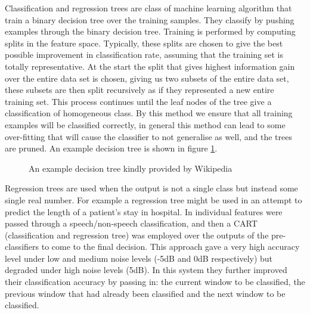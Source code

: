 \documentclass[ %
                    author={Sam Phippen},
                supervisor={Dr. Rafal Bogacz},
                     title={Real time voice activity detectors in noisy personal computing environments},
                  subtitle={},
                    degree={MEng},
                      year={2012} ]{thesis}
\begin{document}
Classification and regression trees are class of machine learning algorithm
that train a binary decision tree over the training samples. They classify by
pushing examples through the binary decision tree. Training is performed by
computing splits in the feature space. Typically, these splits are chosen to
give the best possible improvement in classification rate, assuming that the
training set is totally representative. At the start the split that gives
highest information gain over the entire data set is chosen, giving us two
subsets of the entire data set, these subsets are then split recursively as if
they represented a new entire training set. This process continues until the
leaf nodes of the tree give a classification of homogeneous class. By this
method we ensure that all training examples will be classified correctly, in
general this method can lead to some over-fitting that will cause the classifier
to not generalise as well, and the trees are pruned. An example decision tree
is shown in figure \ref{fig:decision-tree}.

\begin{figure}


    \caption{An example decision tree kindly provided by Wikipedia}
    \label{fig:decision-tree}
\end{figure}

Regression trees are used when the output is not a single class but instead
some single real number. For example a regression tree might be used in an
attempt to predict the length of a patient's stay in hospital. In \cite{shin}
individual features were passed through a speech/non-speech classification, and
then a CART (classification and regression tree) was employed over the outputs
of the pre-classifiers to come to the final decision. This approach gave a very
high accuracy level under low and medium noise levels (-5dB and 0dB
respectively) but degraded under high noise levels (5dB). In this system they
further improved their classification accuracy by passing in: the current window
to be classified, the previous window that had already been classified and the
next window to be classified.
\end{document}
